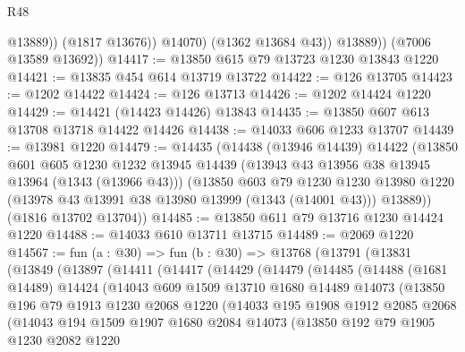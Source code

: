 \begin{lexlean}{R48}
\begin{coremodule}
                    @13889))
                (@1817 @13676))
              @14070)
            (@1362 @13684 @43))
          @13889))
      (@7006 @13589 @13692))
@14417 := @13850 @615 @79 @13723 @1230 @13843 @1220
@14421 := @13835 @454 @614 @13719 @13722
@14422 := @126 @13705
@14423 := @1202 @14422
@14424 := @126 @13713
@14426 := @1202 @14424 @1220
@14429 := @14421 (@14423 @14426) @13843
@14435 := @13850 @607 @613 @13708 @13718 @14422 @14426
@14438 := @14033 @606 @1233 @13707
@14439 := @13981 @1220
@14479 := @14435
    (@14438
      (@13946 @14439)
      @14422
      (@13850
        @601
        @605
        @1230
        @1232
        @13945
        @14439
        (@13943 @43 @13956 @38 @13945 @13964 (@1343 (@13966 @43)))
        (@13850
          @603
          @79
          @1230
          @1230
          @13980
          @1220
          (@13978 @43 @13991 @38 @13980 @13999 (@1343 (@14001 @43)))
          @13889))
      (@1816 @13702 @13704))
@14485 := @13850 @611 @79 @13716 @1230 @14424 @1220
@14488 := @14033 @610 @13711 @13715
@14489 := @2069 @1220
@14567 := fun (a : @30) =>
  fun (b : @30) =>
  @13768
    (@13791
      (@13831
        (@13849
          (@13897
            (@14411
              (@14417
                (@14429
                  (@14479
                    (@14485
                      (@14488
                        (@1681 @14489)
                        @14424
                        (@14043
                          @609
                          @1509
                          @13710
                          @1680
                          @14489
                          @14073
                          (@13850
                            @196
                            @79
                            @1913
                            @1230
                            @2068
                            @1220
                            (@14033
                              @195
                              @1908
                              @1912
                              @2085
                              @2068
                              (@14043
                                @194
                                @1509
                                @1907
                                @1680
                                @2084
                                @14073
                                (@13850
                                  @192
                                  @79
                                  @1905
                                  @1230
                                  @2082
                                  @1220

\end{coremodule}
\end{lexlean}
